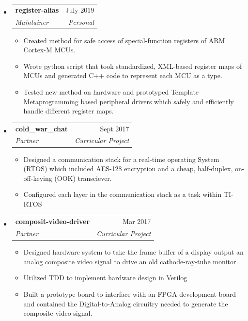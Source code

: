 \documentclass[letterpaper,10pt]{article}
\makeatletter
\newcommand{\ResumeSubheading}[4]{
  \vspace{-1pt}\item
    \begin{tabular*}{\textwidth}[t]{l@{\extracolsep{\fill}}r}
      \textbf{#1} & #2 \\
      \textit{\small#3} & \textit{\small #4} \\
    \end{tabular*}
  \vspace{-5pt}
}
\newenvironment{SubheadingList}
  {\begin{itemize}[label=,leftmargin=0em]}
  {\end{itemize}}
\makeatother
\begin{document}
\begin{SubheadingList}
    {thermistor}{July 2019 -- Aug 2019}
    {Maintainer}{Personal}
    \begin{itemize}
      \item Utilized Template Metaprogramming to create a header-only library
        that generates lookup-tables for thermistors.
      \item Implemented unit tests that proved accuracy of mathematical models.
      \item Created an interface that makes it easy for users to work with
        different datasheet specifications and circuit configurations.
    \end{itemize}
  \ResumeSubheading
    {register-alias}{July 2019}
    {Maintainer}{Personal}
    \begin{itemize}
      \item Created method for safe access of special-function registers of ARM
        Cortex-M MCUs.
      \item Wrote python script that took standardized, XML-based register maps
        of MCUs and generated C++ code to represent each MCU as a type.
      \item Tested new method on hardware and prototyped Template
        Metaprogramming based peripheral drivers which safely and efficiently
        handle different register maps.
    \end{itemize}
  \ResumeSubheading
    {cold\_war\_chat}{Sept 2017}
    {Partner}{Curricular Project}
    \begin{itemize}
      \item Designed a communication stack for a real-time operating System (RTOS)
        which included AES-128 encryption and a cheap, half-duplex,
        on-off-keying (OOK) transciever.
      \item Configured each layer in the communication stack as a task within
        TI-RTOS
    \end{itemize}
  \ResumeSubheading
    {composit-video-driver}{Mar 2017}
    {Partner}{Curricular Project}
    \begin{itemize}
      \item Designed hardware system to take the frame buffer of a display
        output an analog composite video signal to drive an old cathode-ray-tube
        monitor.
      \item Utilized TDD to implement hardware design in Verilog
      \item Built a prototype board to interface with an FPGA development board
        and contained the Digital-to-Analog circuitry needed to generate the
        composite video signal.
    \end{itemize}
\end{SubheadingList}
\end{document}
